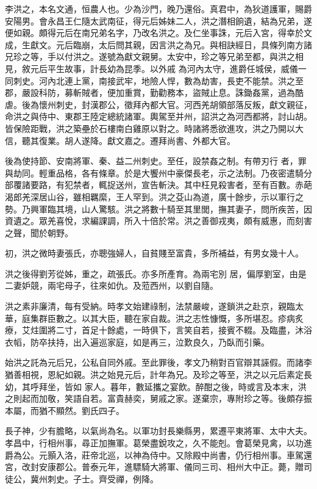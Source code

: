 \begin{pinyinscope}
 李洪之，本名文通，恒農人也。少為沙門，晚乃還俗。真君中，為狄道護軍，賜爵安陽男。會永昌王仁隨太武南征，得元后姊妹二人，洪之潛相餉遺，結為兄弟，遂便如親。頗得元后在南兄弟名字，乃改名洪之。及仁坐事誅，元后入宮，得幸於文成，生獻文。元后臨崩，太后問其親，因言洪之為兄。與相訣經日，具條列南方諸兄珍之等，手以付洪之。遂號為獻文親舅。太安中，珍之等兄弟至都，與洪之相見，敘元后平生故事，計長幼為昆季。以外戚
 為河內太守，進爵任城侯，威儀一同刺史。河內北連上黨，南接武牢，地險人悍，數為劫害，長吏不能禁。洪之至郡，嚴設科防，募斬賊者，便加重賞，勤勸務本，盜賊止息。誅鋤姦黨，過為酷虐。後為懷州刺史，封漢郡公，徵拜內都大官。河西羌胡領部落反叛，獻文親征，命洪之與侍中、東郡王陸定總統諸軍。輿駕至并州，詔洪之為河西都將，討山胡。皆保險距戰，洪之築壘於石樓南白雞原以對之。時諸將悉欲進攻，洪之乃開以大信，聽其復業。胡人遂降。獻文嘉之。遷拜尚書、外都大官。



 後為使持節、安南將軍、秦、益二州刺史。至任，設禁姦之制。有帶刃行
 者，罪與劫同。輕重品格，各有條章。於是大饗州中豪傑長老，示之法制。乃夜密遣騎分部覆諸要路，有犯禁者，輒捉送州，宣告斬決。其中枉見殺害者，至有百數。赤葩渴郎羌深居山谷，雖相羈縻，王人罕到。洪之芟山為道，廣十餘步，示以軍行之勢。乃興軍臨其境，山人驚駭。洪之將數十騎至其里閭，撫其妻子，問所疾苦，因資遺之。眾羌喜悅，求編課調，所入十倍於常。洪之善御戎夷，頗有威惠，而刻害之聲，聞於朝野。



 初，洪之微時妻張氏，亦聰強婦人，自貧賤至富貴，多所補益，有男女幾十人。



 洪之後得劉芳從姊，重之，疏張氏。亦多所產育。為兩宅別
 居，偏厚劉室，由是二妻妒競，兩宅母子，往來如仇。及蒞西州，以劉自隨。



 洪之素非廉清，每有受納。時孝文始建祿制，法禁嚴峻，遂鎖洪之赴京，親臨太華，庭集群臣數之。以其大臣，聽在家自裁。洪之志性慷慨，多所堪忍。疹病炙療，艾炷圍將二寸，首足十餘處，一時俱下，言笑自若，接賓不輟。及臨盡，沐浴衣幍，防卒扶持，出入遍巡家庭，如是再三，泣歎良久，乃臥而引藥。



 始洪之託為元后兄，公私自同外戚。至此罪後，孝文乃稍對百官辯其誣假。而諸李猶善相視，恩紀如親。洪之始見元后，計年為兄。及珍之等至，洪之以元后素定長幼，其呼拜坐，皆如
 家人。暮年，數延攜之宴飲。醉酣之後，時或言及本末，洪之則起而加敬，笑語自若。富貴赫奕，舅戚之家。遂棄宗，專附珍之等。後頗存振本屬，而猶不顯然。劉氏四子。



 長子神，少有膽略，以氣尚為名。以軍功封長樂縣男，累遷平東將軍、太中大夫。孝昌中，行相州事，尋正加撫軍。葛榮盡銳攻之，久不能剋。會葛榮見禽，以功進爵為公。元顥入洛，莊帝北巡，以神為侍中。又除殿中尚書，仍行相州事。車駕還宮，改封安康郡公。普泰元年，進驃騎大將軍、儀同三司、相州大中正。薨，贈司徒公，冀州刺史。子士。齊受禪，例降。




\end{pinyinscope}
